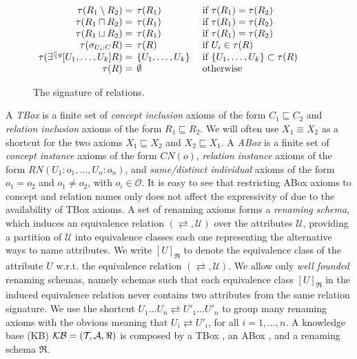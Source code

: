 \documentclass[envcountsame,draft]{llncs}
\newcommand{\Ob}{\ensuremath{\mathcal{O}}\xspace}
\begin{document}
\begin{figure*}[t] 
	\begin{center}
		\renewcommand{\arraystretch}{1.2} $ { 
		\begin{array}{r@{\hspace{1ex}}l@{\hspace{3ex}}l@{\hspace{.3ex}}} 
			\tau(R_1\setminus R_2) = & \tau(R_1) & \text{if } \tau(R_1)=\tau(R_2)\\
			\tau(R_{1}\sqcap R_{2}) = & \tau(R_1) & \text{if } \tau(R_1)=\tau(R_2)\\
			\tau(R_{1}\sqcup R_{2}) = & \tau(R_1) & \text{if } \tau(R_1)=\tau(R_2)\\
			\tau(\selects{U_i}{C}{R}) = & \tau(R) & \text{if } U_i\in\tau(R)\\
			\tau(\EXISTR{q}{U_1,\ldots,U_k} R) = & \{U_1,\ldots,U_k\} & \text{if } \{U_1,\ldots,U_k\}\subset \tau(R)\\
			\tau(R) = & \emptyset & \text{otherwise} 
		\end{array}
		}$ 
		\renewcommand{\arraystretch}{1} 
	\end{center}
	\caption{\label{fig:syn:tau} The signature of \DLRp relations.} 
\end{figure*}

A \DLRp \emph{TBox} \Tmc is a finite set of \emph{concept inclusion} axioms of the form $C_1\sqsubseteq C_2$ 
and \emph{relation inclusion} axioms of the form $R_1\sqsubseteq R_2$.
We will often use $X_1\equiv X_2$ as a shortcut for the two axioms 
$X_1\sqsubseteq X_2$ and $X_2\sqsubseteq X_1$. 
A \DLRp \emph{ABox} \Amc is a finite set of \emph{concept instance} axioms of the form $C\!N(o)$, 
\emph{relation instance} axioms of the form $R\!N(U_1\!:\!o_1,\ldots,U_n\!:\!o_n)$, and 
\emph{same/distinct individual} axioms of the form $o_1 = o_2$ and $o_1 \neq o_2$, with $o_i\in\Ob$. 
It is easy to see that restricting ABox axioms to concept and relation names only does not affect the 
expressivity of \DLRp due to the availability of TBox axioms.
%
A set of renaming axioms forms a \emph{renaming schema}, which induces an equivalence relation 
$(\rightleftarrows,\mathcal{U})$ over the attributes $\mathcal{U}$, providing a partition of $\mathcal{U}$ into equivalence 
classes each one representing the alternative ways to name attributes. We write $[U]_\Re$ to denote the equivalence 
class of the attribute $U$ w.r.t. the equivalence relation $(\rightleftarrows,\mathcal{U})$. 
We allow only \emph{well founded} renaming schemas, namely schemas such that each equivalence class $[U]_\Re$ in 
the induced equivalence relation never contains two attributes from the same relation signature. 
%
We use the shortcut $U_1\ldots U_n\rightleftarrows U'_1\ldots U'_n$ to group many renaming axioms 
with the obvious meaning that $U_i\rightleftarrows U'_i$, for all $i=1,\ldots, n$.
%
A \DLRp knowledge base (KB) $\mathcal{KB}=(\mathcal{T}\!,\mathcal{A},\Re)$ is composed by a TBox \Tmc, an ABox \Amc, and 
a renaming schema $\Re$.
\end{document}
